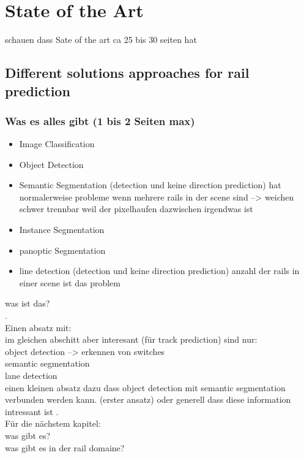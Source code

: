 \chapter{State of the Art}
\label{sec:stateOfTheArt}

schauen dass Sate of the art ca 25 bis 30 seiten hat

\section{Different solutions approaches for rail prediction}

\subsection{Was es alles gibt (1 bis 2 Seiten max)}

\begin{itemize}
    \item Image Classification
    \item Object Detection
    \item Semantic Segmentation (detection und keine direction prediction) hat normalerweise probleme wenn mehrere rails in der scene sind --> weichen schwer trennbar weil der pixelhaufen dazwischen irgendwas ist
    \item Instance Segmentation
    \item panoptic Segmentation
    \item line detection (detection und keine direction prediction) anzahl der rails in einer scene ist das problem
\end{itemize}

was ist das? \\
.\\
Einen absatz mit: \\
im gleichen abschitt aber interesant (für track prediction) sind nur: \\
object detection --> erkennen von switches \\
semantic segmentation \\
lane detection \\
einen kleinen absatz dazu dass object detection mit semantic segmentation verbunden werden kann. (erster ansatz) oder generell dass diese information intressant ist
.\\
Für die nächstem kapitel:\\
was gibt es?\\
was gibt es in der rail domaine?\\


